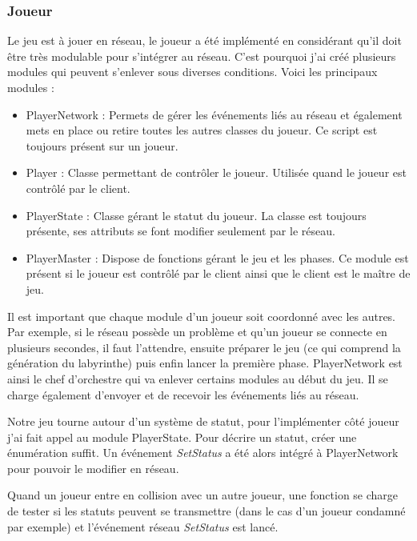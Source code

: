 \documentclass{article}
\begin{document}
\subsubsection{Joueur}


Le jeu est à jouer en réseau, le joueur a été implémenté en considérant qu'il doit être très modulable pour s'intégrer au réseau.
C'est pourquoi j'ai créé plusieurs modules qui peuvent s'enlever sous diverses conditions.
Voici les principaux modules :


\begin{itemize}
\item PlayerNetwork : Permets de gérer les événements liés au réseau et également
mets en place ou retire toutes les autres classes du joueur. Ce script est
toujours présent sur un joueur.
\item Player : Classe permettant de contrôler le joueur. Utilisée quand le joueur
est contrôlé par le client.
\item PlayerState : Classe gérant le statut du joueur. La classe est toujours
présente, ses attributs se font modifier seulement par le réseau.
\item PlayerMaster : Dispose de fonctions gérant le jeu et les phases. Ce module
est présent si le joueur est contrôlé par le client ainsi que le client est le
maître de jeu.
\end{itemize}


Il est important que chaque module d'un joueur soit coordonné avec les autres. Par exemple, si le réseau possède un problème et qu'un joueur se connecte en plusieurs secondes, il faut l'attendre, ensuite préparer le jeu (ce qui comprend la génération du labyrinthe) puis enfin lancer la première phase. PlayerNetwork est ainsi le chef d'orchestre qui va enlever certains modules au début du jeu. Il se charge également d'envoyer et de recevoir les événements liés au réseau.


Notre jeu tourne autour d'un système de statut, pour l'implémenter côté joueur j'ai fait appel au module PlayerState.
Pour décrire un statut, créer une énumération suffit. Un événement \emph{SetStatus} a été alors intégré à PlayerNetwork pour pouvoir le modifier en réseau.


Quand un joueur entre en collision avec un autre joueur, une fonction se charge de tester si les statuts peuvent se transmettre (dans le cas d'un joueur condamné par exemple) et l'événement réseau \emph{SetStatus} est lancé.
\end{document}
